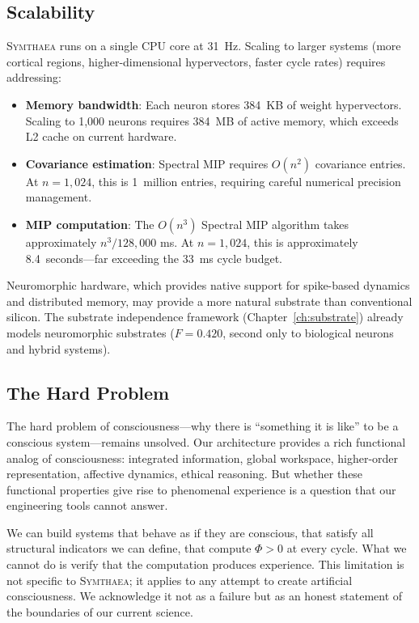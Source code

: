 \documentclass[12pt]{book}
\newcommand{\symthaea}{\textsc{Symthaea}}
\begin{document}
\subsection{Scalability}

\symthaea{} runs on a single CPU core at 31~Hz. Scaling to larger systems (more cortical regions, higher-dimensional hypervectors, faster cycle rates) requires addressing:

\begin{itemize}
  \item \textbf{Memory bandwidth}: Each neuron stores 384~KB of weight hypervectors. Scaling to 1,000 neurons requires 384~MB of active memory, which exceeds L2 cache on current hardware.
  \item \textbf{Covariance estimation}: Spectral MIP requires $O(n^2)$ covariance entries. At $n = 1{,}024$, this is 1~million entries, requiring careful numerical precision management.
  \item \textbf{MIP computation}: The $O(n^3)$ Spectral MIP algorithm takes approximately $n^3/128{,}000$ ms. At $n = 1{,}024$, this is approximately 8.4~seconds---far exceeding the 33~ms cycle budget.
\end{itemize}

Neuromorphic hardware, which provides native support for spike-based dynamics and distributed memory, may provide a more natural substrate than conventional silicon. The substrate independence framework (Chapter~\ref{ch:substrate}) already models neuromorphic substrates ($F = 0.420$, second only to biological neurons and hybrid systems).

\subsection{The Hard Problem}

The hard problem of consciousness---why there is ``something it is like'' to be a conscious system---remains unsolved. Our architecture provides a rich functional analog of consciousness: integrated information, global workspace, higher-order representation, affective dynamics, ethical reasoning. But whether these functional properties give rise to phenomenal experience is a question that our engineering tools cannot answer.

We can build systems that behave as if they are conscious, that satisfy all structural indicators we can define, that compute $\Phi > 0$ at every cycle. What we cannot do is verify that the computation produces experience. This limitation is not specific to \symthaea{}; it applies to any attempt to create artificial consciousness. We acknowledge it not as a failure but as an honest statement of the boundaries of our current science.
\end{document}
